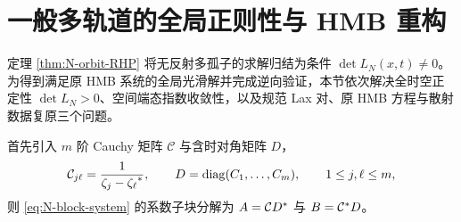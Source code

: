 \section{一般多轨道的全局正则性与 HMB 重构}

定理 \ref{thm:N-orbit-RHP} 将无反射多孤子的求解归结为条件 $\det L_N(x,t)\ne0$。为得到满足原 HMB 系统的全局光滑解并完成逆向验证，本节依次解决全时空正定性 $\det L_N>0$、空间端态指数收敛性，以及规范 Lax 对、原 HMB 方程与散射数据复原三个问题。

首先引入 $m$ 阶 Cauchy 矩阵 $\mathcal C$ 与含时对角矩阵 $D$，
\begin{equation*}
\mathcal C_{j\ell}=\dfrac{1}{\zeta_j-{\zeta_\ell}^{*}},\qquad
D=\operatorname{diag}(C_1,\ldots,C_m),\qquad
1\le j,\ell\le m,
\end{equation*}
则 \eqref{eq:N-block-system} 的系数子块分解为 $A=\mathcal C{D}^{*}$ 与 $B={\mathcal C}^{*}D$。

